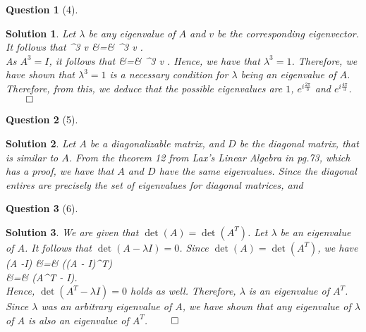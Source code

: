 \documentclass{article} %
\def\eQb#1\eQe{\begin{eqnarray*}#1\end{eqnarray*}}
\theoremstyle{quest}
\newtheorem*{question}{Question}
\newtheorem*{solution}{Solution}
\begin{document}
\pagebreak 

\begin{question}[4]
\end{question}
\begin{solution}
Let $\lambda$ be any eigenvalue of $A$ and $v$ be the corresponding
eigenvector. It follows that
\eQb
A^3 v &=& \lambda^3 v . \\
\eQe
As $A^3 = I$, it follows that
\eQb
v &=& \lambda^3 v .
\eQe
Hence, we have that $\lambda^3 = 1$. Therefore, we have shown that
$\lambda^3 = 1$ is a necessary condition for $\lambda$ being an eigenvalue
of $A$. Therefore, from this, we deduce that the possible eigenvalues are
$1$, $e^{i\frac{2\pi}{3}}$ and $e^{i\frac{4\pi}{3}}$.
\hfill $\qed$ 
\end{solution}
\bigskip

\begin{question}[5]
\end{question}
\begin{solution}
Let $A$ be a diagonalizable matrix, and $D$ be the diagonal matrix, that
is similar to $A$.
From the theorem 12 from Lax's Linear Algebra in pg.73, which has a proof,
we have that $A$ and $D$ have the same eigenvalues. Since the diagonal 
entires are precisely the set of eigenvalues for diagonal matrices, and

\end{solution}

\bigskip

\begin{question}[6]
\end{question}
\begin{solution}
We are given that $\det(A) = \det(A^T)$. Let $\lambda$ be an eigenvalue
of $A$. It follows that $\det(A - \lambda I ) = 0$. Since
$\det(A) = \det(A^T)$, we have 
\eQb
\det(A -\lambda I) &=& \det((A - \lambda I)^T) \\
&=& \det(A^T - \lambda I). \\
\eQe 
Hence, $\det(A^T - \lambda I) = 0$ holds as well.
Therefore, $\lambda$ is an eigenvalue of $A^T$.
Since $\lambda$ was an arbitrary eigenvalue of $A$, we have shown that 
any eigenvalue of $\lambda$ of $A$ is also an eigenvalue of $A^T$.
\hfill $\qed$ 
\end{solution}
\end{document}
